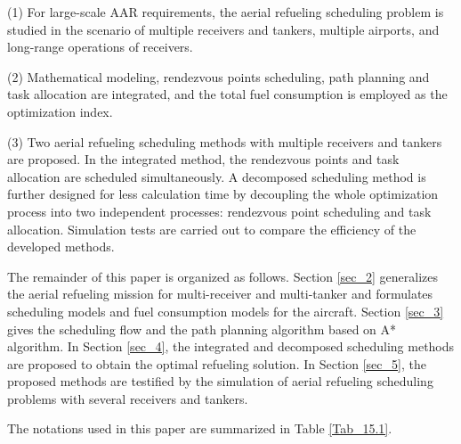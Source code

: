 (1) For large-scale AAR requirements, the aerial refueling scheduling problem is studied in the scenario of multiple receivers and tankers, multiple airports, and long-range operations of receivers.

(2) Mathematical modeling, rendezvous points scheduling, path planning and task allocation are integrated, and the total fuel consumption is employed as the optimization index.

(3) Two aerial refueling scheduling methods with multiple receivers and tankers are proposed. In the integrated method, the rendezvous points and task allocation are scheduled simultaneously. A decomposed scheduling method is further designed for less calculation time by decoupling the whole optimization process into two independent processes: rendezvous point scheduling and task allocation. Simulation tests are carried out to compare the efficiency of the developed methods.

The remainder of this paper is organized as follows. Section \ref{sec_2} generalizes the aerial refueling mission for multi-receiver and multi-tanker and formulates scheduling models and fuel consumption models for the aircraft. Section \ref{sec_3} gives the scheduling flow and the path planning algorithm based on A* algorithm. In Section \ref{sec_4}, the integrated and decomposed scheduling methods are proposed to obtain the optimal refueling solution. In Section \ref{sec_5}, the proposed methods are testified by the simulation of aerial refueling scheduling problems with several receivers and tankers.

The notations used in this paper are summarized in Table \ref{Tab_15.1}.

